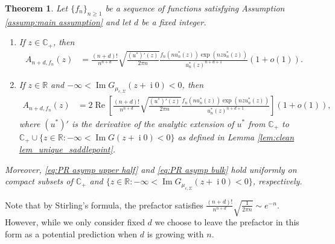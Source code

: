 \documentclass[reqno]{amsart}
\newcommand{\1}{\mathbf{1}}
\DeclareMathOperator{\ii}{i}
\newcommand{\C}{\mathbb{C}}
\renewcommand\Re{\operatorname{Re}}
\renewcommand\Im{\operatorname{Im}}
\newcommand{\R}{\mathbb{R}}
\def\R{\mathbb{R}}
\theoremstyle{plain}
\newtheorem{theorem}{Theorem}[section]
\theoremstyle{definition}
\theoremstyle{remark}
\numberwithin{equation}{section}
\begin{document}
\begin{theorem}\label{thm:Appell Planc-Roa asymp}
	Let $\{f_n\}_{n\geq1}$ be a sequence of functions satisfying Assumption \ref{assump:main assumption} and let $d$ be a fixed integer. \begin{enumerate}
		\item If $z\in\C_{+}$, then  \begin{equation}\label{eq:PR asymp upper half}
			\begin{aligned}
				A_{n+d,f_n}(z)&=\frac{(n+d)!}{n^{n+d}}\sqrt{\frac{(u^*)'(z) }{2\pi n}}\frac{f_{n}\left(nu_n^*(z) \right)\exp\left(nzu_n^*(z) \right)}{u_n^*(z)^{n+d+1}}(1+o(1)).
			\end{aligned}
		\end{equation}
	
		\item If $z\in\R$ and $-\infty<\Im G_{\mu_{c,\Sigma}}(z+\ii0)<0$, then  \begin{equation}\label{eq:PR asymp bulk}
			\begin{aligned}
				A_{n+d,f_n}(z)&=2\Re\left[\frac{(n+d)!}{n^{n+d}}\sqrt{\frac{(u^*)'(z) }{2\pi n}}\frac{f_{n}\left(nu_n^*(z) \right)\exp\left(nzu_n^*(z) \right)}{u_n^*(z)^{n+d+1}}\right](1+o(1)),
			\end{aligned}
		\end{equation}  where $(u^*)'$ is the derivative of the analytic extension of $u^*$ from $\C_{+}$ to $\C_+\cup\{z\in\R: -\infty< \Im G(z+\ii0)<0\}$ as defined in Lemma \ref{lem:clean lem_unique_saddlepoint}.
	\end{enumerate} Moreover, \eqref{eq:PR asymp upper half} and \eqref{eq:PR asymp bulk} hold uniformly on compact subsets of $\C_{+}$ and $\{z\in\R:-\infty< \Im G_{\mu_{c,\Sigma}}(z+\ii0)<0 \}$, respectively. 
\end{theorem} Note that by Stirling's formula, the prefactor satisfies $\frac{(n+d)!}{n^{n+d}}\sqrt{\frac{1}{2\pi n}}\sim e^{-n}$. However, while we only consider fixed $d$ we choose to leave the prefactor in this form as a potential prediction when $d$ is growing with $n$. 
\end{document}
